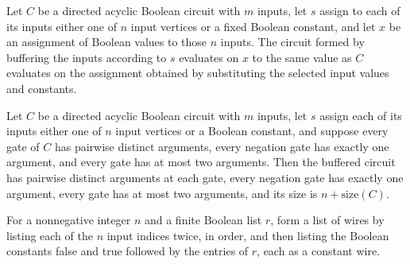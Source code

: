 \begin{theorem}
\label{BoolCircuit.DAGCircuit.bufferInputs_eval}
\leanok
{}
Let $C$ be a directed acyclic Boolean circuit with $m$ inputs, let $s$ assign to each of
its inputs either one of $n$ input vertices or a fixed Boolean constant, and let $x$ be
an assignment of Boolean values to those $n$ inputs. The circuit formed by buffering the
inputs according to $s$ evaluates on $x$ to the same value as $C$ evaluates on the
assignment obtained by substituting the selected input values and constants.
\end{theorem}

\begin{theorem}
\label{BoolCircuit.DAGCircuit.bufferInputs_structure}
\leanok
{}
Let $C$ be a directed acyclic Boolean circuit with $m$ inputs, let $s$ assign each of
its inputs either one of $n$ input vertices or a Boolean constant, and suppose every
gate of $C$ has pairwise distinct arguments, every negation gate has exactly one
argument, and every gate has at most two arguments. Then the buffered circuit has
pairwise distinct arguments at each gate, every negation gate has exactly one argument,
every gate has at most two arguments, and its size is $n+\mathrm{size}(C)$.
\end{theorem}

\begin{definition}
\label{BoolCircuit.pairWireList}
\leanok
For a nonnegative integer $n$ and a finite Boolean list $r$, form a list of wires by
listing each of the $n$ input indices twice, in order, and then listing the Boolean
constants false and true followed by the entries of $r$, each as a constant wire.
\end{definition}

